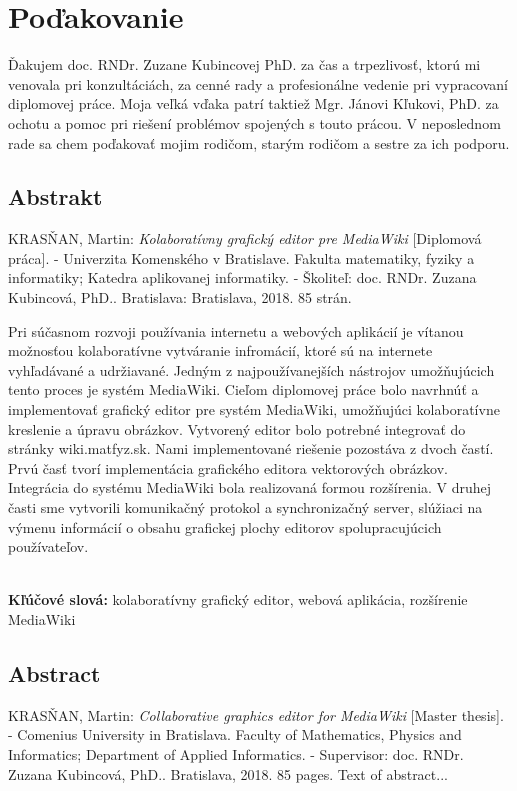 \documentclass[12pt, a4paper, oneside]{book}
\newcommand\mftitle{Kolaboratívny grafický editor pre MediaWiki}
\newcommand\enmftitle{Collaborative graphics editor for MediaWiki}
\newcommand\mfthesistype{Diplomová práca}
\newcommand\enmfthesistype{Master thesis}
\newcommand\mfadvisor{doc. RNDr. Zuzana Kubincová, PhD.}
\newcommand\mfplacedate{Bratislava, 2018}
\newcommand\mfpracovisko{Katedra aplikovanej informatiky}
\newcommand\enmfpracovisko{Department of Applied Informatics}
\begin{document}
\chapter*{Poďakovanie}\label{chap:thank_you}
Ďakujem doc. RNDr. Zuzane Kubincovej PhD. za čas a trpezlivosť, ktorú mi venovala pri konzultáciách, za cenné rady a profesionálne vedenie pri vypracovaní diplomovej práce. Moja veľká vďaka patrí taktiež Mgr. Jánovi Kľukovi, PhD. za ochotu a pomoc pri riešení problémov spojených s touto prácou. V neposlednom rade sa chem poďakovať mojim rodičom, starým rodičom a sestre za ich podporu. 
\vfill\eject 

\def\spaceafterpar{1em}
\setlength{\parskip}{\spaceafterpar}
\setlength\parindent{0pt}

\section*{Abstrakt}\label{chap:abstract_sk}
\MakeUppercase{Krasňan}, Martin: \textit{\mftitle} [\mfthesistype]. - Univerzita Komenského v Bratislave. Fakulta matematiky, fyziky a informatiky; \mfpracovisko. - Školiteľ: \mfadvisor. Bratislava: \mfplacedate. 85 strán.

Pri súčasnom rozvoji používania internetu a webových aplikácií je vítanou možnosťou kolaboratívne vytváranie infromácií, ktoré sú na internete vyhľadávané a udržiavané. Jedným z najpoužívanejších nástrojov umožňujúcich tento proces je systém MediaWiki.
Cieľom diplomovej práce bolo navrhnúť a implementovať grafický editor pre systém MediaWiki, umožňujúci kolaboratívne kreslenie a úpravu obrázkov. Vytvorený editor bolo potrebné integrovať do stránky wiki.matfyz.sk. Nami implementované riešenie pozostáva z dvoch častí. Prvú časť tvorí implementácia grafického editora vektorových obrázkov. Integrácia do systému MediaWiki bola realizovaná formou rozšírenia. V druhej časti sme vytvorili komunikačný protokol a synchronizačný server, slúžiaci na výmenu informácií o obsahu grafickej plochy editorov spolupracujúcich používateľov. 

~\\
\textbf{Kľúčové slová:} kolaboratívny grafický editor, webová aplikácia, rozšírenie MediaWiki
\vfill\eject 

\section*{Abstract}\label{chap:abstract_en}
\MakeUppercase{Krasňan}, Martin: \textit{\enmftitle} [\enmfthesistype]. - Comenius University in Bratislava. Faculty of Mathematics, Physics and Informatics; \enmfpracovisko. - Supervisor: \mfadvisor. \mfplacedate. 85 pages.
Text of abstract...
\end{document}
